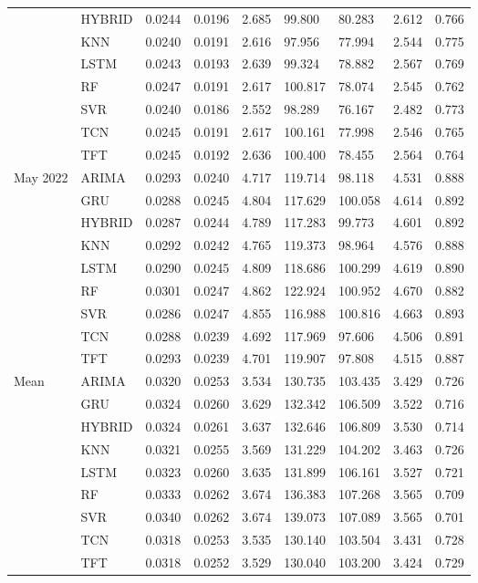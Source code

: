 \begin{tabular}{lllllllll}
 & HYBRID & 0.0244 & 0.0196 & 2.685 & 99.800 & 80.283 & 2.612 & 0.766 \\
 & KNN & 0.0240 & 0.0191 & 2.616 & 97.956 & 77.994 & 2.544 & 0.775 \\
 & LSTM & 0.0243 & 0.0193 & 2.639 & 99.324 & 78.882 & 2.567 & 0.769 \\
 & RF & 0.0247 & 0.0191 & 2.617 & 100.817 & 78.074 & 2.545 & 0.762 \\
 & SVR & 0.0240 & 0.0186 & 2.552 & 98.289 & 76.167 & 2.482 & 0.773 \\
 & TCN & 0.0245 & 0.0191 & 2.617 & 100.161 & 77.998 & 2.546 & 0.765 \\
 & TFT & 0.0245 & 0.0192 & 2.636 & 100.400 & 78.455 & 2.564 & 0.764 \\
May 2022 & ARIMA & 0.0293 & 0.0240 & 4.717 & 119.714 & 98.118 & 4.531 & 0.888 \\
 & GRU & 0.0288 & 0.0245 & 4.804 & 117.629 & 100.058 & 4.614 & 0.892 \\
 & HYBRID & 0.0287 & 0.0244 & 4.789 & 117.283 & 99.773 & 4.601 & 0.892 \\
 & KNN & 0.0292 & 0.0242 & 4.765 & 119.373 & 98.964 & 4.576 & 0.888 \\
 & LSTM & 0.0290 & 0.0245 & 4.809 & 118.686 & 100.299 & 4.619 & 0.890 \\
 & RF & 0.0301 & 0.0247 & 4.862 & 122.924 & 100.952 & 4.670 & 0.882 \\
 & SVR & 0.0286 & 0.0247 & 4.855 & 116.988 & 100.816 & 4.663 & 0.893 \\
 & TCN & 0.0288 & 0.0239 & 4.692 & 117.969 & 97.606 & 4.506 & 0.891 \\
 & TFT & 0.0293 & 0.0239 & 4.701 & 119.907 & 97.808 & 4.515 & 0.887 \\
Mean & ARIMA & 0.0320 & 0.0253 & 3.534 & 130.735 & 103.435 & 3.429 & 0.726 \\
 & GRU & 0.0324 & 0.0260 & 3.629 & 132.342 & 106.509 & 3.522 & 0.716 \\
 & HYBRID & 0.0324 & 0.0261 & 3.637 & 132.646 & 106.809 & 3.530 & 0.714 \\
 & KNN & 0.0321 & 0.0255 & 3.569 & 131.229 & 104.202 & 3.463 & 0.726 \\
 & LSTM & 0.0323 & 0.0260 & 3.635 & 131.899 & 106.161 & 3.527 & 0.721 \\
 & RF & 0.0333 & 0.0262 & 3.674 & 136.383 & 107.268 & 3.565 & 0.709 \\
 & SVR & 0.0340 & 0.0262 & 3.674 & 139.073 & 107.089 & 3.565 & 0.701 \\
 & TCN & 0.0318 & 0.0253 & 3.535 & 130.140 & 103.504 & 3.431 & 0.728 \\
 & TFT & 0.0318 & 0.0252 & 3.529 & 130.040 & 103.200 & 3.424 & 0.729 \\
\bottomrule
\end{tabular}
